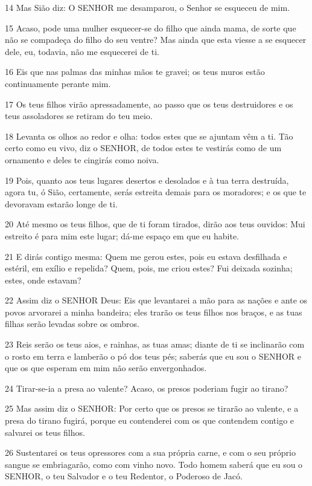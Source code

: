 \par 14 Mas Sião diz: O SENHOR me desamparou, o Senhor se esqueceu de mim.
\par 15 Acaso, pode uma mulher esquecer-se do filho que ainda mama, de sorte que não se compadeça do filho do seu ventre? Mas ainda que esta viesse a se esquecer dele, eu, todavia, não me esquecerei de ti.
\par 16 Eis que nas palmas das minhas mãos te gravei; os teus muros estão continuamente perante mim.
\par 17 Os teus filhos virão apressadamente, ao passo que os teus destruidores e os teus assoladores se retiram do teu meio.
\par 18 Levanta os olhos ao redor e olha: todos estes que se ajuntam vêm a ti. Tão certo como eu vivo, diz o SENHOR, de todos estes te vestirás como de um ornamento e deles te cingirás como noiva.
\par 19 Pois, quanto aos teus lugares desertos e desolados e à tua terra destruída, agora tu, ó Sião, certamente, serás estreita demais para os moradores; e os que te devoravam estarão longe de ti.
\par 20 Até mesmo os teus filhos, que de ti foram tirados, dirão aos teus ouvidos: Mui estreito é para mim este lugar; dá-me espaço em que eu habite.
\par 21 E dirás contigo mesma: Quem me gerou estes, pois eu estava desfilhada e estéril, em exílio e repelida? Quem, pois, me criou estes? Fui deixada sozinha; estes, onde estavam?
\par 22 Assim diz o SENHOR Deus: Eis que levantarei a mão para as nações e ante os povos arvorarei a minha bandeira; eles trarão os teus filhos nos braços, e as tuas filhas serão levadas sobre os ombros.
\par 23 Reis serão os teus aios, e rainhas, as tuas amas; diante de ti se inclinarão com o rosto em terra e lamberão o pó dos teus pés; saberás que eu sou o SENHOR e que os que esperam em mim não serão envergonhados.
\par 24 Tirar-se-ia a presa ao valente? Acaso, os presos poderiam fugir ao tirano?
\par 25 Mas assim diz o SENHOR: Por certo que os presos se tirarão ao valente, e a presa do tirano fugirá, porque eu contenderei com os que contendem contigo e salvarei os teus filhos.
\par 26 Sustentarei os teus opressores com a sua própria carne, e com o seu próprio sangue se embriagarão, como com vinho novo. Todo homem saberá que eu sou o SENHOR, o teu Salvador e o teu Redentor, o Poderoso de Jacó.

